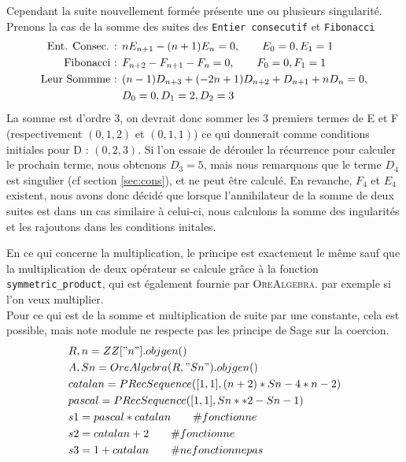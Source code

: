 \documentclass[12pt]{article}
\begin{document}
        \par Cependant la suite nouvellement formée présente une ou plusieurs singularité.
        Prenons la cas
        de la somme des suites des  \texttt{Entier consecutif} et \texttt{Fibonacci}
        \begin{align*}
            \textnormal{Ent. Consec. : } &nE_{n+1} - (n+1)E_n = 0,\qquad E_0 = 0, E_1 = 1\\
            \textnormal{Fibonacci : } &F_{n+2} - F_{n+1} - F_n = 0,\qquad F_0=0, F_1=1\\
            \textnormal{Leur Sommme : } &(n - 1)D_{n+3} + (-2n + 1)D_{n+2} + D_{n+1} + nD_n = 0, \\
            &D_0 = 0, D_1 = 2, D_2 = 3\\
        \end{align*} 
        La somme est d'ordre 3, on devrait donc sommer les 3 premiers termes de E et F (respectivement 
        $(0,1,2)$ et $(0,1,1)$) ce qui donnerait comme conditions initiales pour D : $(0,2,3)$.
        Si 
        l'on essaie de dérouler la récurrence pour calculer le prochain terme, nous obtenons $D_3 = 5$,
        mais nous remarquons que le terme $D_4$ est singulier (cf section \ref{sec:cons}), et ne peut 
        être calculé. En revanche, $F_4$ et $E_4$ existent, nous avons donc décidé que lorsque l'annihilateur
        de la somme de deux suites est dans un cas similaire à celui-ci, nous calculons la somme des
        ingularités et les rajoutons dans les conditions initales.
        \par En ce qui concerne la multiplication, le principe est exactement le même sauf que la 
        multiplication de deux opérateur se calcule grâce à la fonction \texttt{symmetric\_product},
        qui est également fournie par \textsc{OreAlgebra}.
        par exemple si l'on veux multiplier.\\
        Pour ce qui est de la somme et multiplication de suite par une constante, cela est possible, mais 
        note module ne respecte pas les principe de Sage sur la coercion.
        \begin{align*}
            &R,n = ZZ["n"].objgen()\\
            &A,Sn = OreAlgebra(R,"Sn").objgen()\\
            &catalan = PRecSequence([1,1],(n + 2)*Sn - 4*n - 2)\\
            &pascal = PRecSequence([1,1],Sn**2 - Sn - 1)\\
            &s1 = pascal * catalan \qquad\# fonctionne\\
            &s2 = catalan + 2 \qquad\# fonctionne\\
            &s3 = 1 + catalan \qquad\# ne fonctionne pas\\
        \end{align*} \\
\end{document}
